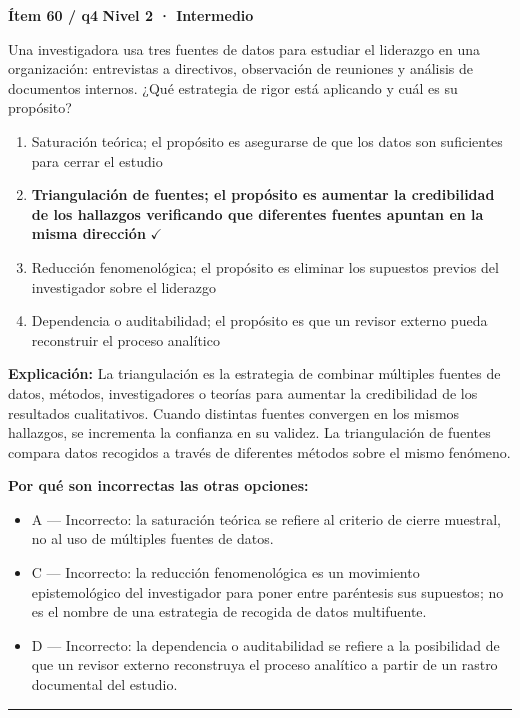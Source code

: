 \documentclass[12pt,a4paper]{article}
\begin{document}
\begin{mdframed}[backgroundcolor=fondogris,linecolor=ambar,linewidth=1pt,innerleftmargin=10pt,innerrightmargin=10pt,innertopmargin=7pt,innerbottommargin=7pt]
\textbf{Ítem 60 / q4} \hfill {\small\bfseries\color{ambar} Nivel 2 · Intermedio}
\end{mdframed}

Una investigadora usa tres fuentes de datos para estudiar el liderazgo en una organización: entrevistas a directivos, observación de reuniones y análisis de documentos internos. ¿Qué estrategia de rigor está aplicando y cuál es su propósito?

\begin{enumerate}
  \item[A.] Saturación teórica; el propósito es asegurarse de que los datos son suficientes para cerrar el estudio
  \item[\textbf{\color{verde}B.}] \textbf{\color{verde} Triangulación de fuentes; el propósito es aumentar la credibilidad de los hallazgos verificando que diferentes fuentes apuntan en la misma dirección} \hfill $\checkmark$
  \item[C.] Reducción fenomenológica; el propósito es eliminar los supuestos previos del investigador sobre el liderazgo
  \item[D.] Dependencia o auditabilidad; el propósito es que un revisor externo pueda reconstruir el proceso analítico
\end{enumerate}

\noindent\textbf{\color{azul}Explicación:} La triangulación es la estrategia de combinar múltiples fuentes de datos, métodos, investigadores o teorías para aumentar la credibilidad de los resultados cualitativos. Cuando distintas fuentes convergen en los mismos hallazgos, se incrementa la confianza en su validez. La triangulación de fuentes compara datos recogidos a través de diferentes métodos sobre el mismo fenómeno.

\noindent\textbf{\color{gris}Por qué son incorrectas las otras opciones:}
\begin{itemize}
  \item {\small A — Incorrecto: la saturación teórica se refiere al criterio de cierre muestral, no al uso de múltiples fuentes de datos.}
  \item {\small C — Incorrecto: la reducción fenomenológica es un movimiento epistemológico del investigador para poner entre paréntesis sus supuestos; no es el nombre de una estrategia de recogida de datos multifuente.}
  \item {\small D — Incorrecto: la dependencia o auditabilidad se refiere a la posibilidad de que un revisor externo reconstruya el proceso analítico a partir de un rastro documental del estudio.}
\end{itemize}
\vspace{8pt}\hrule\vspace{10pt}
\end{document}
